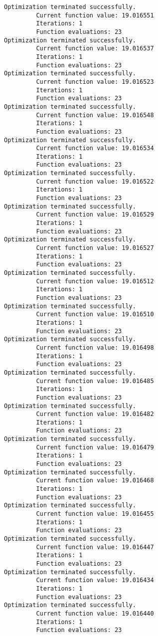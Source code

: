 \documentclass[11pt]{article}
\begin{document}
\begin{Verbatim}[commandchars=\\\{\}]
Optimization terminated successfully.
         Current function value: 19.016551
         Iterations: 1
         Function evaluations: 23
Optimization terminated successfully.
         Current function value: 19.016537
         Iterations: 1
         Function evaluations: 23
Optimization terminated successfully.
         Current function value: 19.016523
         Iterations: 1
         Function evaluations: 23
Optimization terminated successfully.
         Current function value: 19.016548
         Iterations: 1
         Function evaluations: 23
Optimization terminated successfully.
         Current function value: 19.016534
         Iterations: 1
         Function evaluations: 23
Optimization terminated successfully.
         Current function value: 19.016522
         Iterations: 1
         Function evaluations: 23
Optimization terminated successfully.
         Current function value: 19.016529
         Iterations: 1
         Function evaluations: 23
Optimization terminated successfully.
         Current function value: 19.016527
         Iterations: 1
         Function evaluations: 23
Optimization terminated successfully.
         Current function value: 19.016512
         Iterations: 1
         Function evaluations: 23
Optimization terminated successfully.
         Current function value: 19.016510
         Iterations: 1
         Function evaluations: 23
Optimization terminated successfully.
         Current function value: 19.016498
         Iterations: 1
         Function evaluations: 23
Optimization terminated successfully.
         Current function value: 19.016485
         Iterations: 1
         Function evaluations: 23
Optimization terminated successfully.
         Current function value: 19.016482
         Iterations: 1
         Function evaluations: 23
Optimization terminated successfully.
         Current function value: 19.016479
         Iterations: 1
         Function evaluations: 23
Optimization terminated successfully.
         Current function value: 19.016468
         Iterations: 1
         Function evaluations: 23
Optimization terminated successfully.
         Current function value: 19.016455
         Iterations: 1
         Function evaluations: 23
Optimization terminated successfully.
         Current function value: 19.016447
         Iterations: 1
         Function evaluations: 23
Optimization terminated successfully.
         Current function value: 19.016434
         Iterations: 1
         Function evaluations: 23
Optimization terminated successfully.
         Current function value: 19.016440
         Iterations: 1
         Function evaluations: 23

\end{Verbatim}
\end{document}

